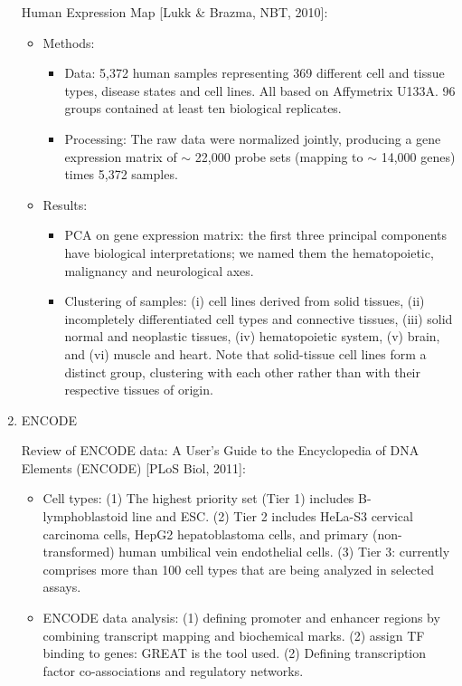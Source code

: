 \documentclass{report}
\begin{document}
\begin{enumerate}
	Human Expression Map [Lukk \& Brazma, NBT, 2010]:
	\begin{itemize}
		\item Methods: 
		\begin{itemize}
			\item Data: 5,372 human samples representing 369 different cell and tissue types, disease states and cell lines. All based on Affymetrix U133A. 96 groups contained at least ten biological replicates.
			\item Processing: The raw data were normalized jointly, producing a gene expression matrix of $\sim$ 22,000 probe sets (mapping to $\sim$ 14,000 genes) times 5,372 samples. 
		\end{itemize}
		
		\item Results: 
		\begin{itemize}
			\item PCA on gene expression matrix: the first three principal components have biological interpretations; we named them the hematopoietic, malignancy and neurological axes. 
			\item Clustering of samples: (i) cell lines derived from solid tissues, (ii) incompletely differentiated cell types and connective tissues, (iii) solid normal and neoplastic tissues, (iv) hematopoietic system, (v) brain, and (vi) muscle and heart. Note that solid-tissue cell lines form a distinct group, clustering with each other rather than with their respective tissues of origin. 
		\end{itemize}
	\end{itemize}
	
	\item{ENCODE}
	
	Review of ENCODE data: A User's Guide to the Encyclopedia of DNA Elements (ENCODE) [PLoS Biol, 2011]: 
	\begin{itemize}
		\item Cell types: (1) The highest priority set (Tier 1) includes B-lymphoblastoid line and ESC. (2) Tier 2 includes HeLa-S3 cervical carcinoma cells, HepG2 hepatoblastoma cells, and primary (non-transformed) human umbilical vein endothelial cells. (3) Tier 3: currently comprises more than 100 cell types that are being analyzed in selected assays.
		
		\item ENCODE data analysis: (1) defining promoter and enhancer regions by combining transcript mapping and biochemical marks. (2) assign TF binding to genes: GREAT is the tool used. (2) Defining transcription factor co-associations and regulatory networks. 
	\end{itemize}
	

\end{enumerate}
\end{document}
